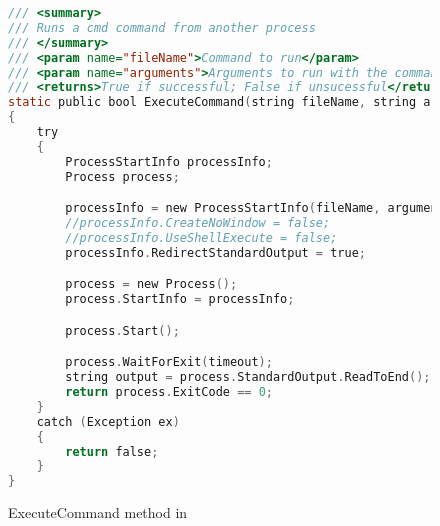 
\label{ExecuteCommand Method}


\begin{figure}
\begin{lstlisting}[language=C]
/// <summary>
/// Runs a cmd command from another process
/// </summary>
/// <param name="fileName">Command to run</param>
/// <param name="arguments">Arguments to run with the command</param>
/// <returns>True if successful; False if unsucessful</returns>
static public bool ExecuteCommand(string fileName, string arguments, int timeout = 5000)
{
	try
	{
		ProcessStartInfo processInfo;
		Process process;

		processInfo = new ProcessStartInfo(fileName, arguments);
		//processInfo.CreateNoWindow = false;
		//processInfo.UseShellExecute = false;
		processInfo.RedirectStandardOutput = true;

		process = new Process();
		process.StartInfo = processInfo;

		process.Start();

		process.WaitForExit(timeout);
		string output = process.StandardOutput.ReadToEnd();
		return process.ExitCode == 0;
	}
	catch (Exception ex)
	{
		return false;
	}
}

\end{lstlisting}
\caption{ExecuteCommand method in \mytool}
\label{fig:ExecuteCommand1}
\end{figure}
